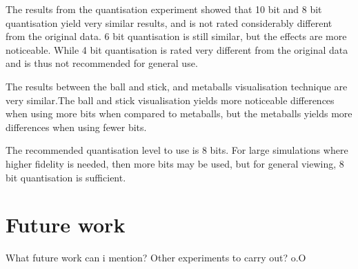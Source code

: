 The results from the quantisation experiment showed that 10 bit and 8 bit
quantisation yield very similar results, and is not rated considerably
different from the original data. 6 bit quantisation is still similar, but the
effects are more noticeable. While 4 bit quantisation is rated very different
from the original data and is thus not recommended for general use.

The results between the ball and stick, and metaballs visualisation technique
are very similar.The ball and stick visualisation yields more noticeable
differences when using more bits when compared to metaballs, but the metaballs
yields more differences when using fewer bits.

The recommended quantisation level to use is 8 bits. For large simulations
where higher fidelity is needed, then more bits may be used, but for general
viewing, 8 bit quantisation is sufficient.


\section{Future work}
\label{sec:conclusion_future}

What future work can i mention? Other experiments to carry out? o.O




